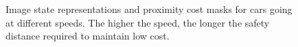 \documentclass{article} %
\begin{document}
\begin{figure}
{  }
  \hspace{15mm}
  \caption{Image state representations and proximity cost masks for cars going at different speeds. The higher the speed, the longer the safety distance required to maintain low cost.}
\label{cost}
\end{figure}
\end{document}
